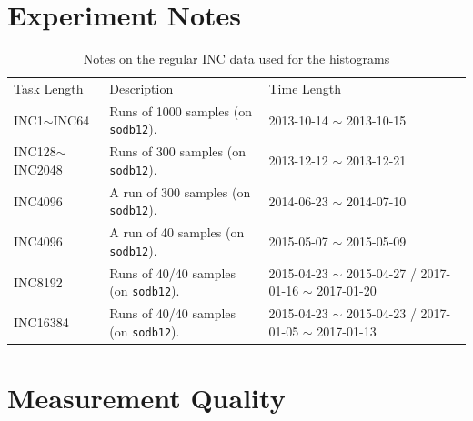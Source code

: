 \documentclass[10pt]{article}
\begin{document}
\section{Experiment Notes}
\begin{table}[h]
\begin{center}
\begin{tabular}{|p{3cm}||p{9cm}|p{4cm}|} \hline
Task Length & Description & Time Length\\ \cline{1-3}
INC1$\sim$INC64 & Runs of 1000 samples (on {\tt sodb12}). & 2013-10-14 $\sim$ 2013-10-15\\ \hline
INC128$\sim$INC2048 & Runs of 300 samples (on {\tt sodb12}). & 2013-12-12 $\sim$ 2013-12-21\\ \hline 
INC4096 & A run of 300 samples (on {\tt sodb12}). & 2014-06-23 $\sim$ 2014-07-10 \\ \hline 
INC4096 & A run of 40 samples (on {\tt sodb12}). & 2015-05-07 $\sim$ 2015-05-09  \\ \hline 
INC8192 & Runs of 40/40 samples (on {\tt sodb12}). & 2015-04-23 $\sim$ 2015-04-27 / 2017-01-16 $\sim$ 2017-01-20\\ \hline
INC16384 & Runs of 40/40 samples (on {\tt sodb12}). & 2015-04-23 $\sim$ 2015-04-23 / 2017-01-05 $\sim$ 2017-01-13\\ \hline 
\end{tabular}
\end{center}
\vspace{-.2in}
\caption{Notes on the regular INC data used for the histograms\label{tab:exp_notes1}}
\end{table}


\section{Measurement Quality~\label{sec:meq}}
\end{document}
